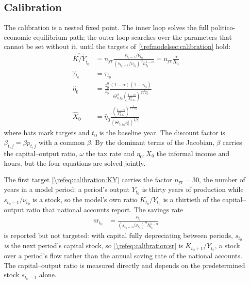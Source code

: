 \subsection{Calibration}\label{\refsec:calibration}
The calibration is a nested fixed point. The inner loop solves the full politico-economic equilibrium path; the outer loop searches over the parameters that cannot be set without it, until the targets of \cref{\refmodelsec:calibration} hold:
\begin{subequations}\label{\refeq:calibration}
    \begin{align}
        \widehat{K/Y}_{t_0} &= n_{\text{yr}}\frac{s_{t_0-1}/\nu_{t_0}}{\left(s_{t_0-1}/\nu_{t_0}\right)^{\alpha} h_{t_0}^{1-\alpha}} = n_{\text{yr}}\frac{\alpha}{R_{t_0}} \label{\refeq:calibration:KY}\\
        \hat{\tau}_{t_0} &= \tau_{t_0} \label{\refeq:calibration:tau}\\
        \hat{\eta}_{0} &= \frac{z_0^{\eta}}{z_0^x}\frac{(1-\alpha)(1-\tau_{t_0})}{\Theta_{h,t_0}^{\alpha}\left(\frac{1-\alpha}{\Gamma_{h,t_0}^{\alpha}}\right)^{\frac{1}{1+\alpha\xi}}} \label{\refeq:calibration:eta0}\\
        \hat{X}_{0} &= \hat{\eta}_{0}\frac{\left(\frac{1-\alpha}{\Gamma_{h,t_0}^{\alpha}}\right)^{\frac{1}{1+\alpha\xi}}}{\left(\Theta_{h,t_0}z_0^x\right)^{1/\xi}} \label{\refeq:calibration:X0}
    \end{align}
\end{subequations}
where hats mark targets and $t_0$ is the baseline year. The discount factor is $\beta_{t,j} = \beta p_{t,j}$ with a common $\beta$. By the dominant terms of the Jacobian, $\beta$ carries the capital--output ratio, $\omega$ the tax rate and $\eta_0, X_0$ the informal income and hours, but the four equations are solved jointly.

The first target \eqref{\refeq:calibration:KY} carries the factor $n_{\text{yr}}=30$, the number of years in a model period: a period's output $Y_{t_0}$ is thirty years of production while $s_{t_0-1}/\nu_{t_0}$ is a stock, so the model's own ratio $K_{t_0}/Y_{t_0}$ is a thirtieth of the capital--output ratio that national accounts report. The savings rate
\begin{align}
    \text{sr}_{t_0} &= \frac{s_{t_0}}{\left(s_{t_0-1}/\nu_{t_0}\right)^{\alpha} h_{t_0}^{1-\alpha}} \label{\refeq:calibration:sr}
\end{align}
is reported but not targeted: with capital fully depreciating between periods, $s_{t_0}$ \emph{is} the next period's capital stock, so \eqref{\refeq:calibration:sr} is $K_{t_0+1}/Y_{t_0}$, a stock over a period's flow rather than the annual saving rate of the national accounts. The capital--output ratio is measured directly and depends on the predetermined stock $s_{t_0-1}$ alone.

